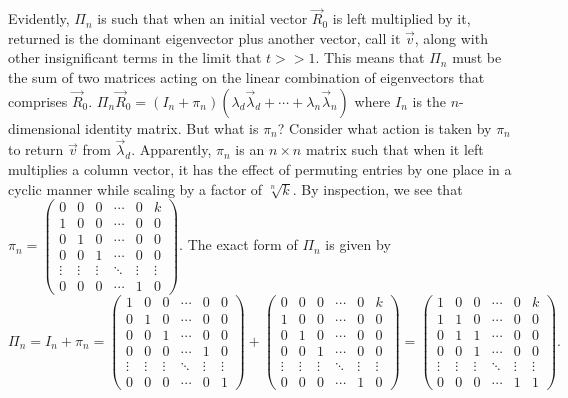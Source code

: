 \documentclass[11pt]{article}
\theoremstyle{plain}
\theoremstyle{definition}
\begin{document}
Evidently, $\Pi_n$ is such that when an initial vector $\vec{R}_0$ is left multiplied by it, returned is the dominant eigenvector plus another vector, call it $\vec{v}$, along with other insignificant terms in the limit that $t>>1$. This means that $\Pi_n$ must be the sum of two matrices acting on the linear combination of eigenvectors that comprises $\vec{R}_0$. $\Pi_n \vec{R}_0 = \left(\textit{I}_n+\pi_n\right)\left(\lambda_d \vec{\lambda}_d+\cdots+\lambda_n \vec{\lambda}_n\right)$ where $\textit{I}_n$ is the $n$-dimensional identity matrix. But what is $\pi_n$? Consider what action is taken by $\pi_n$ to return $\vec{v}$ from $\vec{\lambda}_d$. Apparently, $\pi_n$ is an $n\times n$ matrix such that when it left multiplies a column vector, it has the effect of permuting entries by one place in a cyclic manner while scaling by a factor of $\sqrt[n]{k}$. By inspection, we see that $\pi_n=\left(\begin{array}{cccccc}
0 & 0 & 0 & \cdots  & 0 & k \\
1 & 0 & 0 & \cdots  & 0 & 0 \\
0 & 1 & 0 & \cdots  & 0 & 0 \\
0 & 0 & 1 & \cdots  & 0 & 0 \\
\vdots & \vdots  & \vdots  & \ddots  & \vdots  & \vdots  \\
0 & 0 & 0 & \cdots  & 1 & 0\end{array}\right)$. The exact form of $\Pi_n$ is given by $$\Pi_n=\textit{I}_n+\pi_n=
\left(\begin{array}{cccccc}
1 & 0 & 0 & \cdots & 0 & 0 \\
0 & 1 & 0 & \cdots & 0 & 0 \\
0 & 0 & 1 & \cdots & 0 & 0 \\
0 & 0 & 0 & \cdots & 1 & 0 \\
\vdots & \vdots  & \vdots  & \ddots  & \vdots  & \vdots  \\
0 & 0 & 0 & \cdots & 0  & 1\end{array}\right)
+\left(\begin{array}{cccccc}
0 & 0 & 0 & \cdots  & 0 & k \\
1 & 0 & 0 & \cdots  & 0 & 0 \\
0 & 1 & 0 & \cdots  & 0 & 0 \\
0 & 0 & 1 & \cdots  & 0 & 0 \\
\vdots & \vdots  & \vdots  & \ddots  & \vdots  & \vdots  \\
0 & 0 & 0 & \cdots  & 1 & 0\end{array}\right)
=\left(\begin{array}{cccccc}
1 & 0 & 0 & \cdots  & 0 & k \\
1 & 1 & 0 & \cdots  & 0 & 0 \\
0 & 1 & 1 & \cdots  & 0 & 0 \\
0 & 0 & 1 & \cdots  & 0 & 0 \\
\vdots & \vdots  & \vdots  & \ddots  & \vdots  & \vdots  \\
0 & 0 & 0 & \cdots  & 1 & 1\end{array}\right).$$
\end{document}
